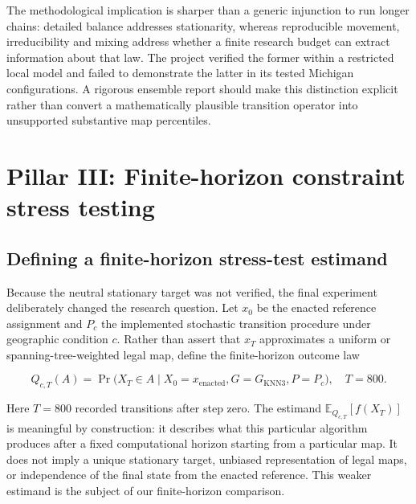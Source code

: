 \documentclass[
  10pt,
]{article}
\begin{document}
The methodological implication is sharper than a generic injunction to
run longer chains: detailed balance addresses stationarity, whereas
reproducible movement, irreducibility and mixing address whether a
finite research budget can extract information about that law. The
project verified the former within a restricted local model and failed
to demonstrate the latter in its tested Michigan configurations. A
rigorous ensemble report should make this distinction explicit rather
than convert a mathematically plausible transition operator into
unsupported substantive map percentiles.

\hypertarget{pillar-iii-finite-horizon-constraint-stress-testing}{%
\section{Pillar III: Finite-horizon constraint stress
testing}\label{pillar-iii-finite-horizon-constraint-stress-testing}}

\hypertarget{defining-a-finite-horizon-stress-test-estimand}{%
\subsection{Defining a finite-horizon stress-test
estimand}\label{defining-a-finite-horizon-stress-test-estimand}}

Because the neutral stationary target was not verified, the final
experiment deliberately changed the research question. Let \(x_0\) be
the enacted reference assignment and \(P_c\) the implemented stochastic
transition procedure under geographic condition \(c\). Rather than
assert that \(x_T\) approximates a uniform or spanning-tree-weighted
legal map, define the finite-horizon outcome law

\begin{equation}
Q_{c,T}(A)
=\Pr\bigl(X_T\in A\mid X_0=x_{\mathrm{enacted}},
G=G_{\mathrm{KNN3}},P=P_c\bigr),\quad T=800.
\end{equation}

Here \(T=800\) recorded transitions after step zero. The estimand
\(\mathbb{E}_{Q_{c,T}}[f(X_T)]\) is meaningful by construction: it
describes what this particular algorithm produces after a fixed
computational horizon starting from a particular map. It does not imply
a unique stationary target, unbiased representation of legal maps, or
independence of the final state from the enacted reference. This weaker
estimand is the subject of our finite-horizon comparison.
\end{document}
